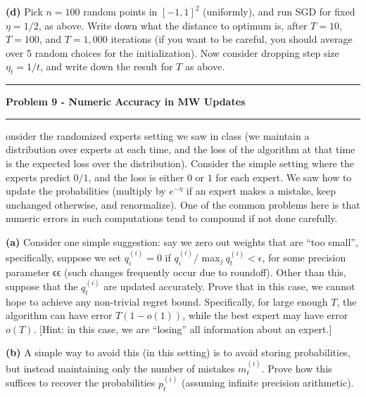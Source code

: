 \documentclass[11pt]{article}
\newcommand\question[2]{\vspace{.25in}\hrule\textbf{#1}\vspace{.5em}\hrule\vspace{.10in}}
\renewcommand\part[1]{\vspace{.10in}\textbf{(#1)}}
\begin{document}

\part{d} Pick $n = 100$ random points in $[-1, 1]^2$ (uniformly), and run SGD for fixed $\eta = 1/2$, as above. Write down what the distance to optimum is, after $T = 10$, $T = 100$, and $T = 1,000$ iterations (if you want to be careful, you should average over 5 random choices for the initialization). Now consider dropping step size $\eta_t = 1/t$, and write down the result for $T$ as above.


\question{Problem 9 - Numeric Accuracy in MW Updates}

Consider the randomized experts setting we saw in class (we maintain a distribution over experts at each time, and the loss of the algorithm at that time is the expected loss over the distribution). Consider the simple setting where the experts predict $0/1$, and the loss is either $0$ or $1$ for each expert. We saw how to update the probabilities (multiply by $e^{-\eta}$ if an expert makes a mistake, keep unchanged otherwise, and renormalize). One of the common problems here is that numeric errors in such computations tend to compound if not done carefully.

\part{a} Consider one simple suggestion: say we zero out weights that are ``too small'', specifically, suppose we set $q_i^{(i)} = 0$ if $q_i^{(i)} /$ max$_j \ q_t^{(i)} < \epsilon$, for some precision parameter ϵϵ (such changes frequently occur due to roundoff). Other than this, suppose that the $q_t^{(i)}$ are updated accurately. Prove that in this case, we cannot hope to achieve any non-trivial regret bound. Specifically, for large enough $T$, the algorithm can have error $T(1 - o(1))$, while the best expert may have error $o(T)$. [Hint: in this case, we are ``losing'' all information about an expert.]

\part{b} A simple way to avoid this (in this setting) is to avoid storing probabilities, but instead maintaining only the number of mistakes $m_t^{(i)}$. Prove how this suffices to recover the probabilities $p_t^{(i)}$ (assuming infinite precision arithmetic).
\end{document}
